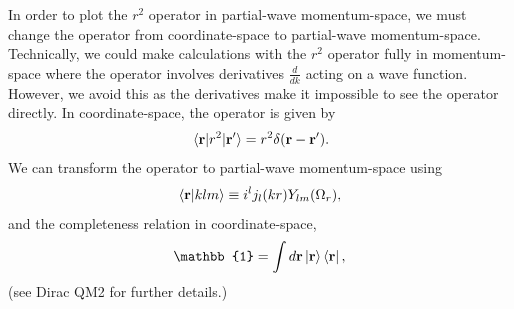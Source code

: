 \documentclass[preprintnumbers,floatfix,aps,prc,preprint,nofootinbib]{revtex4-1}
\begin{document}
In order to plot the $r^2$ operator in partial-wave momentum-space, we must change the operator from coordinate-space to partial-wave momentum-space.
Technically, we could make calculations with the $r^2$ operator fully in momentum-space where the operator involves derivatives $\frac{d}{dk}$ acting on a wave function.
However, we avoid this as the derivatives make it impossible to see the operator directly.
In coordinate-space, the operator is given by
%
\begin{align}
    \label{eq:r2_operator_coordinate_space}
    \mel{\mathbf{r}}{r^2}{\mathbf{r'}} = r^2 \delta(\mathbf{r}-\mathbf{r'}).
\end{align}
%
We can transform the operator to partial-wave momentum-space using
%
\begin{align}
    \label{eq:hankel_transformation}
    \bra{\mathbf{r}} \ket{klm} \equiv i^l j_l(kr) Y_{lm}(\Omega_r),
\end{align}
%
and the completeness relation in coordinate-space,
%
\begin{align}
    \label{eq:completeness_relation_coordinate_space}
    \mathbb{1} = \int d\mathbf{r} \ket{\mathbf{r}} \bra{\mathbf{r}},
\end{align}
%
(see Dirac QM2 for further details.)
\end{document}
